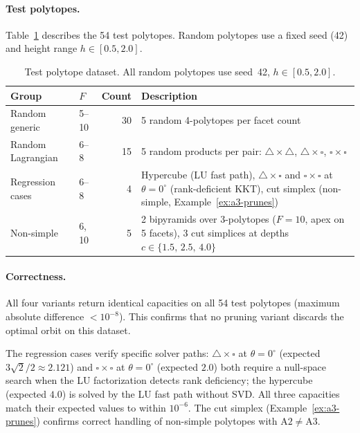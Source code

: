 \paragraph{Test polytopes.}
Table~\ref{tab:ablation-dataset} describes the 54 test polytopes.
Random polytopes use a fixed seed (42) and height range $h \in [0.5, 2.0]$.

\begin{table}[h]
\centering
\begin{tabular}{llrp{5.5cm}}
\toprule
Group & $F$ & Count & Description \\
\midrule
Random generic    & 5--10 & 30 & 5 random 4-polytopes per facet count \\
Random Lagrangian & 6--8 & 15 & 5 random products per pair:
  $\triangle{\times}\triangle$,
  $\triangle{\times}\square$,
  $\square{\times}\square$ \\
Regression cases  & 6--8 &  4 & Hypercube (LU fast path),
  $\triangle{\times}\square$ and $\square{\times}\square$ at $\theta{=}0^\circ$
  (rank-deficient KKT), cut simplex (non-simple, Example~\ref{ex:a3-prunes}) \\
Non-simple        & 6, 10 &  5 & 2 bipyramids over 3-polytopes ($F{=}10$,
  apex on 5 facets), 3 cut simplices at depths $c \in \{1.5,\, 2.5,\, 4.0\}$ \\
\bottomrule
\end{tabular}
\caption{Test polytope dataset. All random polytopes use seed~42, $h \in [0.5, 2.0]$.}
\label{tab:ablation-dataset}
\end{table}

\paragraph{Correctness.}
All four variants return identical capacities on all 54 test polytopes (maximum
absolute difference $< 10^{-8}$).
This confirms that no pruning variant discards the optimal orbit on this dataset.

The regression cases verify specific solver paths:
$\triangle{\times}\square$ at $\theta{=}0^\circ$ (expected $3\sqrt{2}/2 \approx 2.121$) and
$\square{\times}\square$ at $\theta{=}0^\circ$ (expected $2.0$) both require a null-space search
when the LU factorization detects rank deficiency;
the hypercube (expected $4.0$) is solved by the LU fast path without SVD.
All three capacities match their expected values to within $10^{-6}$.
The cut simplex (Example~\ref{ex:a3-prunes}) confirms correct handling of
non-simple polytopes with $\mathrm{A2} \neq \mathrm{A3}$.


